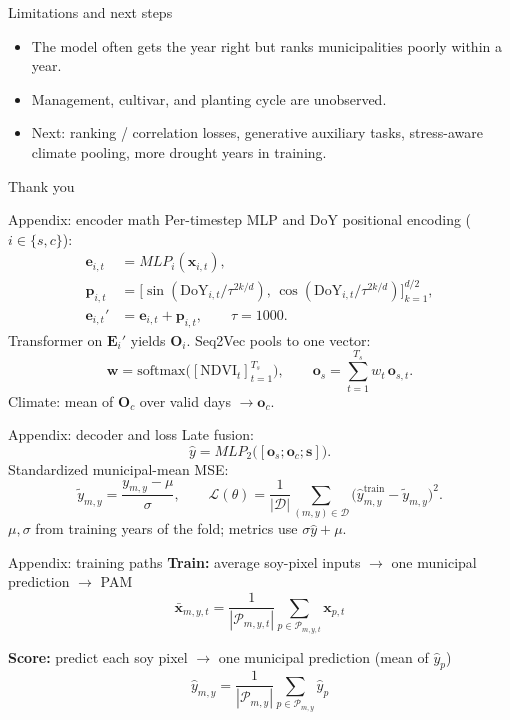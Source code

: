 \documentclass[aspectratio=169,11pt]{beamer}
\begin{document}
\begin{frame}{Limitations and next steps}
  \begin{itemize}
    \item The model often gets the year right but ranks municipalities poorly within a year.
    \item Management, cultivar, and planting cycle are unobserved.
    \item Next: ranking / correlation losses, generative auxiliary tasks, stress-aware climate pooling, more drought years in training.
  \end{itemize}
\end{frame}

\begin{frame}
  \centering
  \vspace{2.5cm}
  {\Large Thank you}
\end{frame}

\appendix

\begin{frame}{Appendix: encoder math}
  Per-timestep MLP and DoY positional encoding ($i\in\{s,c\}$):
  \begin{align*}
    \mathbf{e}_{i,t}
    &=
    MLP_i(\mathbf{x}_{i,t}),
    \\[0.25em]
    \mathbf{p}_{i,t}
    &=
    \bigl[\sin(\mathrm{DoY}_{i,t}/\tau^{2k/d}),\,
          \cos(\mathrm{DoY}_{i,t}/\tau^{2k/d})\bigr]_{k=1}^{d/2},
    \\[0.25em]
    \mathbf{e}_{i,t}'
    &=
    \mathbf{e}_{i,t}+\mathbf{p}_{i,t},
    \qquad
    \tau=1000.
  \end{align*}
  Transformer on $\mathbf{E}_i'$ yields $\mathbf{O}_i$. Seq2Vec pools to one vector:
  \[
    \mathbf{w}
    =
    \mathrm{softmax}\bigl([\mathrm{NDVI}_t]_{t=1}^{T_s}\bigr),
    \qquad
    \mathbf{o}_s
    =
    \sum_{t=1}^{T_s} w_t\,\mathbf{o}_{s,t}.
  \]
  {\footnotesize Climate: mean of $\mathbf{O}_c$ over valid days $\to\mathbf{o}_c$.}
\end{frame}

\begin{frame}{Appendix: decoder and loss}
  Late fusion:
  \[
    \hat{y}
    =
    MLP_2\bigl([\mathbf{o}_s;\mathbf{o}_c;\mathbf{s}]\bigr).
  \]
  Standardized municipal-mean MSE:
  \[
    \tilde{y}_{m,y}
    =
    \frac{y_{m,y}-\mu}{\sigma},
    \qquad
    \mathcal{L}(\theta)
    =
    \frac{1}{|\mathcal{D}|}
    \sum_{(m,y)\in\mathcal{D}}
    \bigl(\hat{y}_{m,y}^{\mathrm{train}}-\tilde{y}_{m,y}\bigr)^2.
  \]
  {\footnotesize $\mu,\sigma$ from training years of the fold; metrics use $\sigma\hat{y}+\mu$.}
\end{frame}

\begin{frame}{Appendix: training paths}
  \textbf{Train:} average soy-pixel inputs $\to$ one municipal prediction $\to$ PAM
  \[
    \bar{\mathbf{x}}_{m,y,t}
    =
    \frac{1}{|\mathcal{P}_{m,y,t}|}
    \sum_{p\in\mathcal{P}_{m,y,t}}
    \mathbf{x}_{p,t}
  \]

  \vspace{0.4em}
  \textbf{Score:} predict each soy pixel $\to$ one municipal prediction (mean of $\hat{y}_p$)
  \[
    \hat{y}_{m,y}
    =
    \frac{1}{|\mathcal{P}_{m,y}|}
    \sum_{p\in\mathcal{P}_{m,y}}
    \hat{y}_p
  \]
\end{frame}
\end{document}
